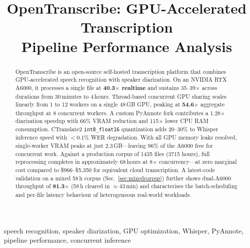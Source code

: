 \documentclass[conference,10pt]{IEEEtran}
\begin{document}
\title{OpenTranscribe: GPU-Accelerated Transcription\\Pipeline Performance Analysis}

\author{
}

\maketitle

\begin{abstract}
OpenTranscribe is an open-source self-hosted transcription platform that
combines GPU-accelerated speech recognition with speaker diarization. On an
NVIDIA RTX A6000, it processes a single file at \textbf{40.3$\times$ realtime}
and sustains 35--39$\times$ across durations from 30\,minutes to 4\,hours.
Thread-based concurrent GPU sharing scales linearly from 1 to 12 workers on a
single 48\,GB GPU, peaking at \textbf{54.6$\times$} aggregate throughput at
8 concurrent workers. A custom PyAnnote fork contributes a 1.28$\times$
diarization speedup with 66\% VRAM reduction and 115$\times$ lower CPU RAM
consumption. CTranslate2 \texttt{int8\_float16} quantization adds 20--30\%
to Whisper inference speed with $<$0.1\% WER degradation. With all GPU memory
leaks resolved, single-worker VRAM peaks at just 2.3\,GB---leaving 96\% of
the A6000 free for concurrent work. Against a production corpus of \num{1435}
files (\num{3715} hours), full reprocessing completes in approximately
68\,hours at 8$\times$ concurrency---at zero marginal cost compared to
\$966--\$5,350 for equivalent cloud transcription. A latest-code validation on a
mixed 58\,h corpus (Sec.~\ref{sec:mixedcorpus}) further shows dual-A6000 throughput of
\textbf{81.3$\times$} (58\,h cleared in $\approx$43\,min) and characterises the
batch-scheduling and per-file latency behaviour of heterogeneous real-world workloads.
\end{abstract}

\begin{IEEEkeywords}
speech recognition, speaker diarization, GPU optimization, Whisper, PyAnnote,
pipeline performance, concurrent inference
\end{IEEEkeywords}
\end{document}
